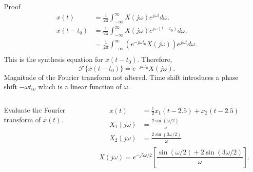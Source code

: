 \begin{frame}[plain]{Proof}
    {
        \begin{align*}
          x(t) &= \frac{1}{2\pi}\int_{-\infty}^{\infty}X(j\omega)e^{j\omega t} d\omega.\\
          x(t - t_0) &= \frac{1}{2\pi}\int_{-\infty}^{\infty}X(j\omega)e^{j\omega (t-t_0)} d\omega.\\
           &= \frac{1}{2\pi}\int_{-\infty}^{\infty}\left(e^{-j\omega t_0}X(j\omega)\right)e^{j\omega t} d\omega.\\
        \end{align*}
        \pause
        This is the synthesis equation for $x(t-t_0)$. Therefore,
        \begin{equation*}
            \mathcal{F}\{x(t-t_0)\} = e^{-j\omega t_0}X(j\omega).
        \end{equation*}
        Magnitude of the Fourier transform not altered. Time shift introduces a phase shift $-\omega t_0$, which is a linear function of $\omega$.
    }
\end{frame}

\begin{frame}
    \begin{columns}
            \begin{example}
            Evaluate the Fourier transform of $x(t)$.
                \begin{figure}
                \centering
                    
                \end{figure}
            \end{example}
        \pause
        {
            \begin{equation*}
                \begin{aligned}
                    x(t) &= \frac{1}{2}x_1(t-2.5) + x_2(t-2.5)\\
                    X_1(j\omega) &= \frac{2\sin(\omega/2)}{\omega}\\
                    X_2(j\omega) &= \frac{2\sin(3\omega/2)}{\omega}\\
                \end{aligned}
            \end{equation*}
            \pause
            \begin{equation*}
                X(j\omega) = e^{-j5\omega/2}\left[\frac{\sin(\omega/2) + 2\sin(3\omega/2)}{\omega}\right].
            \end{equation*}
        }
    \end{columns}

\end{frame}


